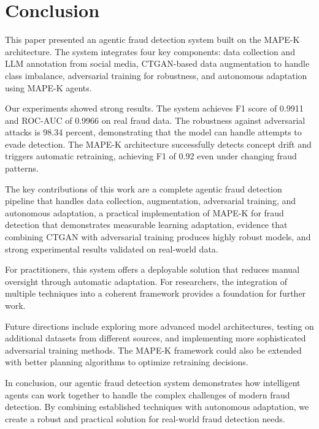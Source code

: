 \section{Conclusion}\label{sec:conclusion}

This paper presented an agentic fraud detection system built on the MAPE-K architecture. The system integrates four key components: data collection and LLM annotation from social media, CTGAN-based data augmentation to handle class imbalance, adversarial training for robustness, and autonomous adaptation using MAPE-K agents.

Our experiments showed strong results. The system achieves F1 score of 0.9911 and ROC-AUC of 0.9966 on real fraud data. The robustness against adversarial attacks is 98.34 percent, demonstrating that the model can handle attempts to evade detection. The MAPE-K architecture successfully detects concept drift and triggers automatic retraining, achieving F1 of 0.92 even under changing fraud patterns.

The key contributions of this work are a complete agentic fraud detection pipeline that handles data collection, augmentation, adversarial training, and autonomous adaptation, a practical implementation of MAPE-K for fraud detection that demonstrates measurable learning adaptation, evidence that combining CTGAN with adversarial training produces highly robust models, and strong experimental results validated on real-world data.

For practitioners, this system offers a deployable solution that reduces manual oversight through automatic adaptation. For researchers, the integration of multiple techniques into a coherent framework provides a foundation for further work.

Future directions include exploring more advanced model architectures, testing on additional datasets from different sources, and implementing more sophisticated adversarial training methods. The MAPE-K framework could also be extended with better planning algorithms to optimize retraining decisions.

In conclusion, our agentic fraud detection system demonstrates how intelligent agents can work together to handle the complex challenges of modern fraud detection. By combining established techniques with autonomous adaptation, we create a robust and practical solution for real-world fraud detection needs.